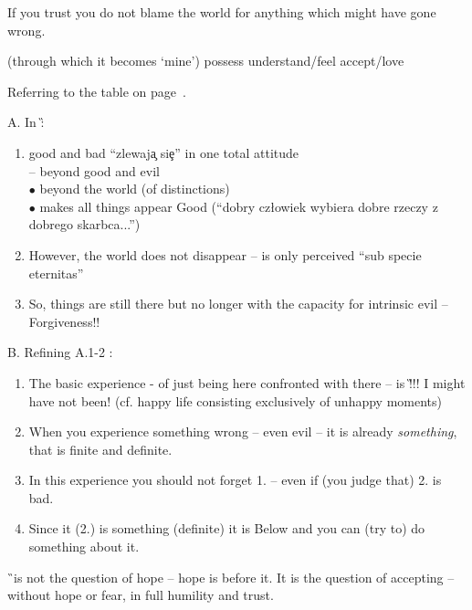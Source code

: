 {{If you trust  you do not blame the world for anything which might have gone wrong.

 (through which it becomes `mine')
\label{lev:accept}
    {possess}
    {understand/feel}
    {accept/love}

Referring to the table on page~\pageref{ta:BtoA}. \nopagebreak

\noindent
A. In \G :  \nopagebreak
\begin{enumerate}\MyLPar
\item  good and bad ``zlewaj\c{a} si\c{e}'' in one total attitude \\
        -- beyond good and evil \\
        $\bullet$ beyond the world (of distinctions) \\
        $\bullet$ makes all things appear Good 
        (``dobry cz{\l}owiek wybiera dobre rzeczy z dobrego skarbca...'')
\item   However, the world does not disappear -- is only perceived 
        ``sub specie eternitas''
\item   So, things are still there but no longer with the capacity for intrinsic evil --
        Forgiveness!!
\end{enumerate}
B. Refining A.1-2 :
\begin{enumerate}\MyLPar
\item The basic experience - of just being here confronted with there -- is \G!!! I might
have not been! (cf. happy life consisting exclusively of unhappy moments)
\item When you experience something wrong -- even evil -- it is already {\em something},
 that is finite and definite. 
\item In this experience you should not forget 1. -- even if (you judge that) 2. is bad.
\item Since it (2.) is something (definite) it is Below and you can 
        (try to) do something about it.
\end{enumerate}
\pa
\G\ is not the question of hope -- hope is before it.
It is the question of accepting -- without hope or fear, in full humility and trust.
\\[3ex]

}}
